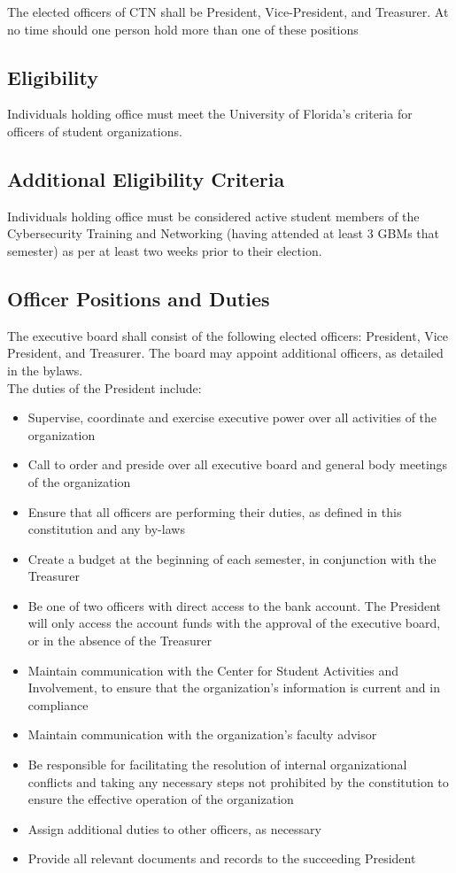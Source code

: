 \documentclass{article}
\def\clubname{CTN }
\def\clubfullname{Cybersecurity Training and Networking }
\begin{document}
The elected officers of \clubname shall be President, Vice-President, and Treasurer. At no time should one person hold more than one of these positions

\subsection{Eligibility}
Individuals holding office must meet the University of Florida’s criteria for officers of student organizations.

\subsection{Additional Eligibility Criteria}
Individuals holding office must be considered active student members of the \clubfullname (having attended at least 3 GBMs that semester) as per at least two weeks prior to their election.

\subsection{Officer Positions and Duties}

The executive board shall consist of the following elected officers: President, Vice President, and Treasurer. The board may appoint additional officers, as detailed in the bylaws. \\

\noindent
The duties of the President include:

\begin{itemize}
    \item Supervise, coordinate and exercise executive power over all activities of the organization
    \item Call to order and preside over all executive board and general body meetings of the organization
    \item Ensure that all officers are performing their duties, as defined in this constitution and any by-laws
    \item Create a budget at the beginning of each semester, in conjunction with the Treasurer
    \item Be one of two officers with direct access to the bank account. The President will only access the account funds with the approval of the executive board, or in the absence of the Treasurer
    \item Maintain communication with the Center for Student Activities and Involvement, to ensure that the organization’s information is current and in compliance
    \item Maintain communication with the organization’s faculty advisor
    \item Be responsible for facilitating the resolution of internal organizational conflicts and taking any necessary steps not prohibited by the constitution to ensure the effective operation of the organization
    \item Assign additional duties to other officers, as necessary
    \item Provide all relevant documents and records to the succeeding President 
\end{itemize}
\end{document}
